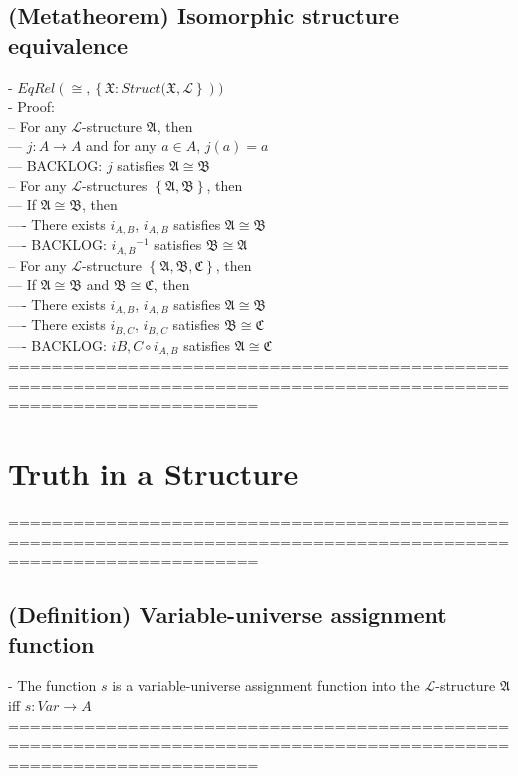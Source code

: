 \documentclass{book}
\newcommand{\set}[1]{\left\{ #1 \right\}}
\begin{document}
\subsection{(Metatheorem) Isomorphic structure equivalence} %
	- $EqRel(\cong, \set{\mathfrak{X}: Struct(\mathfrak{X}, \mathcal{L}}))$ \\
	- Proof: \\
		-- For any $\mathcal{L}$-structure $\mathfrak{A}$, then \\
			--- $j: A \rightarrow A$ and for any $a \in A$, $j(a) = a$ \\
			--- BACKLOG: $j$ satisfies $\mathfrak{A} \cong \mathfrak{B}$ \\
		-- For any $\mathcal{L}$-structures $\set{\mathfrak{A}, \mathfrak{B}}$, then \\
			--- If $\mathfrak{A} \cong \mathfrak{B}$, then \\
				---- There exists $i_{A, B}$, $i_{A, B}$ satisfies $\mathfrak{A} \cong \mathfrak{B}$ \\
				---- BACKLOG: ${i_{A, B}}^{-1}$ satisfies $\mathfrak{B} \cong \mathfrak{A}$ \\
		-- For any $\mathcal{L}$-structure $\set{\mathfrak{A}, \mathfrak{B}, \mathfrak{C}}$, then \\
			--- If $\mathfrak{A} \cong \mathfrak{B}$ and $\mathfrak{B} \cong \mathfrak{C}$, then \\
				---- There exists $i_{A, B}$, $i_{A, B}$ satisfies $\mathfrak{A} \cong \mathfrak{B}$ \\
				---- There exists $i_{B, C}$, $i_{B, C}$ satisfies $\mathfrak{B} \cong \mathfrak{C}$ \\
				---- BACKLOG: $i{B, C} \circ i_{A, B}$ satisfies $\mathfrak{A} \cong \mathfrak{C}$ \\
	===================================================================================================================

\section{Truth in a Structure}
	===================================================================================================================
\subsection{(Definition) Variable-universe assignment function} %
	- The function $s$ is a variable-universe assignment function into the $\mathcal{L}$-structure $\mathfrak{A}$ iff $s: Var \rightarrow A$ \\
	===================================================================================================================
\end{document}
